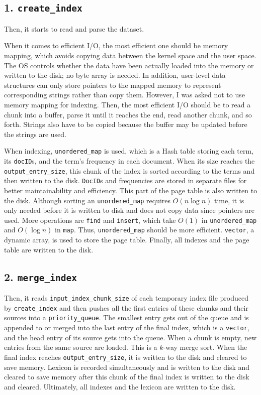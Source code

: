 \documentclass[12pt]{article}
\begin{document}
\hypertarget{1-createindex-2}{%
\subsection{\texorpdfstring{1.
\texttt{create\_index}}{1. create\_index}}\label{1-createindex-2}}

Then, it starts to read and parse the dataset.

When it comes to efficient I/O, the most efficient one should be memory
mapping, which avoids copying data between the kernel space and the user
space. The OS controls whether the data have been actually loaded into
the memory or written to the disk; no byte array is needed. In addition,
user-level data structures can only store pointers to the mapped memory
to represent corresponding strings rather than copy them. However, I was
asked not to use memory mapping for indexing. Then, the most efficient
I/O should be to read a chunk into a buffer, parse it until it reaches
the end, read another chunk, and so forth. Strings also have to be
copied because the buffer may be updated before the strings are used.

When indexing, \texttt{unordered\_map} is used, which is a Hash table
storing each term, its \texttt{docID}s, and the term's frequency in each
document. When its size reaches the \texttt{output\_entry\_size}, this
chunk of the index is sorted according to the terms and then written to
the disk. \texttt{DocID}s and frequencies are stored in separate files
for better maintainability and efficiency. This part of the page table
is also written to the disk. Although sorting an \texttt{unordered\_map}
requires \(O(n \log n)\) time, it is only needed before it is written to
disk and does not copy data since pointers are used. More operations are
\texttt{find} and \texttt{insert}, which take \(O(1)\) in
\texttt{unordered\_map} and \(O(\log n)\) in \texttt{map}. Thus,
\texttt{unordered\_map} should be more efficient. \texttt{vector}, a
dynamic array, is used to store the page table. Finally, all indexes and
the page table are written to the disk.

\hypertarget{2-mergeindex-2}{%
\subsection{\texorpdfstring{2.
\texttt{merge\_index}}{2. merge\_index}}\label{2-mergeindex-2}}

Then, it reads \texttt{input\_index\_chunk\_size} of each temporary
index file produced by \texttt{create\_index} and then pushes all the
first entries of these chunks and their sources into a
\texttt{priority\_queue}. The smallest entry gets out of the queue and
is appended to or merged into the last entry of the final index, which
is a \texttt{vector}, and the head entry of its source gets into the
queue. When a chunk is empty, new entries from the same source are
loaded. This is a \(k\)-way merge sort. When the final index reaches
\texttt{output\_entry\_size}, it is written to the disk and cleared to
save memory. Lexicon is recorded simultaneously and is written to the
disk and cleared to save memory after this chunk of the final index is
written to the disk and cleared. Ultimately, all indexes and the lexicon
are written to the disk.
\end{document}
